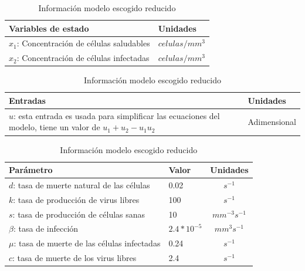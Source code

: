 \documentclass{article}
\begin{document}
    \begin{table}[H]
    \centering
    \begin{tabular}{|p{6cm} p{2.5cm}|}
        \hline
        \textbf{Variables de estado} & \textbf{Unidades} \\
        \hline
        $x_1$: Concentración de células saludables & $celulas / mm^3$\\
        $x_2$: Concentración de células infectadas & $celulas / mm^3$\\
        \hline
    \end{tabular}

    \vspace{0.5cm}

    \begin{tabular}{|p{8.5cm} p{2.5cm}|}
        \hline
        \textbf{Entradas} & \textbf{Unidades} \\
        \hline
        $u$: esta entrada es usada para simplificar las ecuaciones del modelo,
             tiene un valor de $u_1+u_2-u_1 u_2$ & Adimensional \\
        \hline
    \end{tabular}

    \vspace{0.5cm}

    \begin{tabular}{|p{7cm} p{2cm} c|}
        \hline
        \textbf{Parámetro} & \textbf{Valor} & \textbf{Unidades} \\
        \hline
        $d$: tasa de muerte natural de las células      & 0.02            & $s^{-1}$\\
        $k$: tasa de producción de virus libres         & 100             & $s^{-1}$\\
        $s$: tasa de producción de células sanas        & 10              & $mm^{-3} s^{-1}$\\
        $\beta$: tasa de infección                      & $2.4 * 10^{-5}$ & $mm^3 s^{-1}$\\
        $\mu$: tasa de muerte de las células infectadas & 0.24            & $s^{-1}$\\
        $c$: tasa de muerte de los virus libres         & 2.4             & $s^{-1}$\\
        \hline
    \end{tabular}
    \caption{Información modelo escogido reducido \cite{model}}
    \label{table:modelReduced}
    \end{table}

    \vspace{0.5cm}
\end{document}
